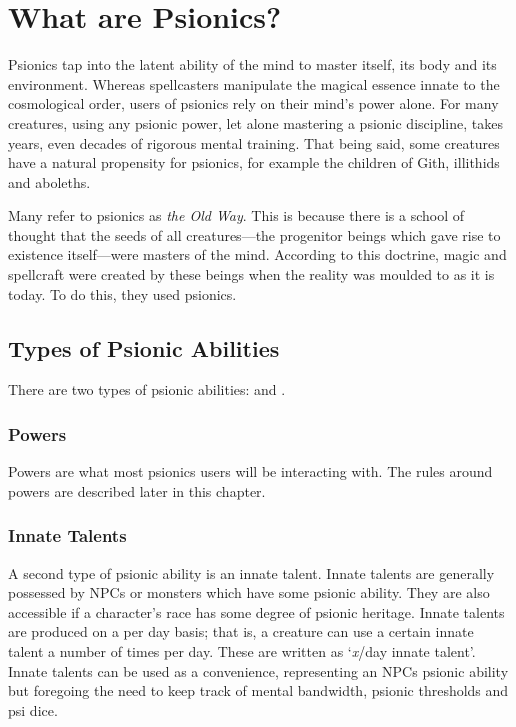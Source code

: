 \section{What are Psionics?}
\label{sec:what_are_psionics}
Psionics tap into the latent ability of the mind
to master itself, its body and its environment.
Whereas spellcasters manipulate the magical essence
innate to the cosmological order,
users of psionics rely on their mind's power alone.
For many creatures,
using any psionic power,
let alone mastering a psionic discipline,
takes years, even decades of rigorous mental training.
That being said,
some creatures have a natural propensity for psionics,
for example the children of Gith, illithids and aboleths.

Many refer to psionics as \emph{the Old Way}.
This is because there is a school of thought that
the seeds of all creatures---the progenitor beings
which gave rise to existence itself---were
masters of the mind.
According to this doctrine,
magic and spellcraft were created by these
beings when the reality was moulded to as it is today.
To do this, they used psionics.

\subsection{Types of Psionic Abilities}
There are two types of psionic abilities:
 and .

\subsubsection{Powers}
Powers are what most psionics users will be
interacting with.
The rules around powers are described
later in this chapter.

\subsubsection{Innate Talents}
A second type of psionic ability is an innate talent.
Innate talents are generally possessed by NPCs or
monsters which have some psionic ability.
They are also accessible if a character's race
has some degree of psionic heritage.
Innate talents are produced on a per day basis;
that is, a creature can use a certain innate talent
a number of times per day.
These are written as `\textit{x}/day innate talent'.
Innate talents can be used as a convenience,
representing an NPCs psionic ability but
foregoing the need to keep track of mental bandwidth,
psionic thresholds and psi dice.

